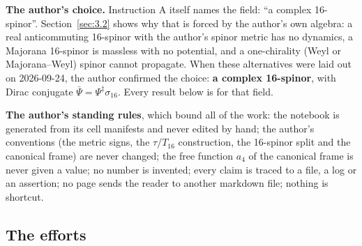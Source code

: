 \textbf{The author's choice.} Instruction A itself names the field: ``a complex 16-spinor''. Section~\ref{sec:3.2} shows why that is forced by the author's own algebra: a real anticommuting 16-spinor with the author's spinor metric has no dynamics, a Majorana 16-spinor is massless with no potential, and a one-chirality (Weyl or Majorana--Weyl) spinor cannot propagate. When these alternatives were laid out on 2026-09-24, the author confirmed the choice: \textbf{a complex 16-spinor}, with Dirac conjugate $\bar\Psi = \Psi^{\ddagger} \sigma_{16}$. Every result below is for that field.

\textbf{The author's standing rules}, which bound all of the work: the notebook is generated from its cell manifests and never edited by hand; the author's conventions (the metric signs, the $\tau$/$T_{16}$ construction, the 16-spinor split and the canonical frame) are never changed; the free function $a_{4}$ of the canonical frame is never given a value; no number is invented; every claim is traced to a file, a log or an assertion; no page sends the reader to another markdown file; nothing is shortcut.

\subsection{The efforts}
\label{sec:0.2}

